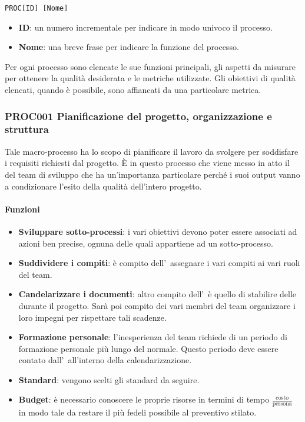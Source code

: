\begin{center}
	\texttt{PROC[ID] [Nome]}
\end{center}

\begin{itemize}
	\item \textbf{ID}: un numero incrementale per indicare in modo univoco il processo.
	\item \textbf{Nome}: una breve frase per indicare la funzione del processo.
\end{itemize}

Per ogni processo sono elencate le sue funzioni principali, gli aspetti da misurare per ottenere la qualità desiderata e le metriche utilizzate.
Gli obiettivi di qualità elencati, quando è possibile, sono affiancati da una particolare metrica. 

	\subsubsection{PROC001 Pianificazione del progetto, organizzazione e struttura}
	Tale macro-processo ha lo scopo di pianificare il lavoro da svolgere per soddisfare i requisiti richiesti dal progetto. È in questo processo che viene messo in atto il  del team di sviluppo che ha un'importanza particolare perché i suoi output vanno a condizionare l'esito della qualità dell'intero progetto.
	
		\paragraph*{Funzioni}
	
		\begin{itemize}
			\item \textbf{Sviluppare sotto-processi}: i vari obiettivi devono poter essere associati ad azioni ben precise, ognuna delle quali appartiene ad un sotto-processo.
			\item \textbf{Suddividere i compiti}: è compito dell'\Amm\ assegnare i vari compiti ai vari ruoli del team.
			\item \textbf{Candelarizzare i documenti}: altro compito dell'\Amm\ è quello di stabilire delle  durante il progetto. Sarà poi compito dei vari membri del team organizzare i loro impegni per rispettare tali scadenze.
			\item \textbf{Formazione personale}: l'inesperienza del team richiede di un periodo di formazione personale più lungo del normale. Questo periodo deve essere contato dall'\Amm\ all'interno della calendarizzazione.
			\item \textbf{Standard}: vengono scelti gli standard da seguire.
			\item \textbf{Budget}: è necessario conoscere le proprie risorse in termini di tempo $\frac{\text{costo}}{\text{persona}}$ in modo tale da restare
				il più fedeli possibile al preventivo stilato.
		\end{itemize}
	
